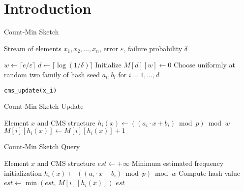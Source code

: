 \section{Introduction}

\begin{algorithm}[H]
\caption{Count-Min Sketch}
\begin{algorithmic}[1]
\Require Stream of elements $x_1, x_2, \dots, x_n$, error $\varepsilon$, failure probability $\delta$

\State $w \gets \lceil e / \varepsilon \rceil$ 
\State $d \gets \lceil \log(1/\delta) \rceil$ 
\State Initialize $M[d][w] \gets 0$ 
\State Choose uniformly at random two family of hash seed $a_i, b_i$ for $i = 1, \dots, d$

    \State \texttt{cms\_update(x\_i)}
\EndFor
\end{algorithmic}


\end{algorithm}
\begin{algorithm}[H]
\caption{Count-Min Sketch Update}
\begin{algorithmic}[1]
\Require Element $x$ and CMS structure 
    \State $h_i(x) \gets ((a_i \cdot x + b_i) \bmod p) \bmod w$ 
    \State $M[i][h_i(x)] \gets M[i][h_i(x)] + 1$
\EndFor
\end{algorithmic}
\end{algorithm}

\begin{algorithm}[H]
\caption{Count-Min Sketch Query}
\begin{algorithmic}[1]
    \Require Element $x$ and CMS structure
    \State $est \gets +\infty$  \Comment Minimum estimated frequency initialization
        \State $h_i(x) \gets ((a_i \cdot x + b_i) \bmod p) \bmod w$ \Comment Compute hash value
        \State $est \gets \min(est,\, M[i][h_i(x)])$
    \EndFor
    \State \Return $est$
\end{algorithmic}
\end{algorithm}
